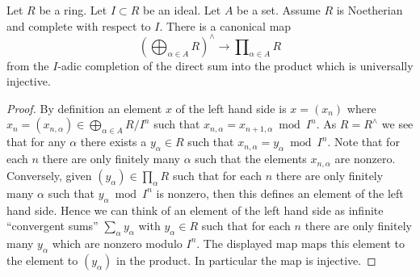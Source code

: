 \begin{lemma}
\label{lemma-ui-completion-direct-sum-into-product}
Let $R$ be a ring.
Let $I \subset R$ be an ideal.
Let $A$ be a set.
Assume $R$ is Noetherian and complete with respect to $I$. There is a
canonical map
$$
\left(\bigoplus\nolimits_{\alpha \in A} R\right)^\wedge
\longrightarrow
\prod\nolimits_{\alpha \in A} R
$$
from the $I$-adic completion of the direct sum into the product
which is universally injective.
\end{lemma}

\begin{proof}
By definition an element $x$ of the left hand side is $x = (x_n)$ where
$x_n = (x_{n, \alpha}) \in \bigoplus\nolimits_{\alpha \in A} R/I^n$
such that $x_{n, \alpha} = x_{n + 1, \alpha} \bmod I^n$.
As $R = R^\wedge$ we see that for any $\alpha$ there exists a $y_\alpha \in R$
such that $x_{n, \alpha} = y_\alpha \bmod I^n$. Note that for each $n$ there
are only finitely many $\alpha$ such that the elements $x_{n, \alpha}$ are
nonzero. Conversely, given $(y_\alpha) \in \prod_\alpha R$ such that for each
$n$ there are only finitely many $\alpha$ such that $y_{\alpha} \bmod I^n$
is nonzero, then this defines an element of the left hand side.
Hence we can think of an element of the left hand side as infinite
``convergent sums'' $\sum_\alpha y_\alpha$ with $y_\alpha \in R$
such that for each $n$ there are only finitely many $y_\alpha$
which are nonzero modulo $I^n$. The displayed map maps this element
to the element to $(y_\alpha)$ in the product.
In particular the map is injective.


\end{proof}
